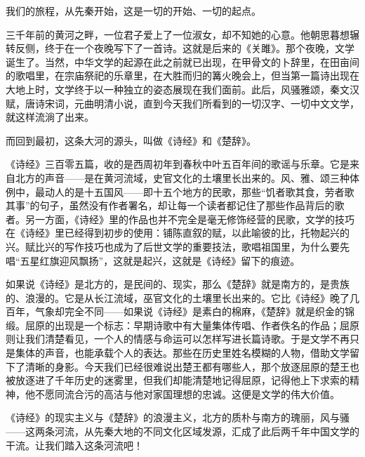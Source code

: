 
\begin{intro}
我们的旅程，从先秦开始，这是一切的开始、一切的起点。

三千年前的黄河之畔，一位君子爱上了一位淑女，却不知她的心意。他朝思暮想辗转反侧，终于在一个夜晚写下了一首诗。这就是后来的《关雎》。那个夜晚，文学诞生了。当然，中华文学的起源在此之前就已出现，在甲骨文的卜辞里，在田亩间的歌唱里，在宗庙祭祀的乐章里，在大胜而归的篝火晚会上，但当第一篇诗出现在大地上时，文学终于以一种独立的姿态展现在我们面前。此后，风骚雅颂，秦文汉赋，唐诗宋词，元曲明清小说，直到今天我们所看到的一切汉字、一切中文文学，就这样流淌了出来。

而回到最初，这条大河的源头，叫做《诗经》和《楚辞》。

《诗经》三百零五篇，收的是西周初年到春秋中叶五百年间的歌谣与乐章。它是来自北方的声音——是在黄河流域，史官文化的土壤里长出来的。风、雅、颂三种体例中，最动人的是十五国风——即十五个地方的民歌，那些“饥者歌其食，劳者歌其事”的句子，虽然没有作者署名，却让每一个读者都记住了那些作品背后的歌者。另一方面，《诗经》里的作品也并不完全是毫无修饰经营的民歌，文学的技巧在《诗经》里已经得到初步的使用：铺陈直叙的赋，以此喻彼的比，托物起兴的兴。赋比兴的写作技巧也成为了后世文学的重要技法，歌唱祖国里，为什么要先唱“五星红旗迎风飘扬”，这就是起兴，这就是《诗经》留下的痕迹。

如果说《诗经》是北方的，是民间的、现实，那么《楚辞》就是南方的，是贵族的、浪漫的。它是从长江流域，巫官文化的土壤里长出来的。它比《诗经》晚了几百年，气象却完全不同——如果说《诗经》是素白的棉麻，《楚辞》就是织金的锦缎。屈原的出现是一个标志：早期诗歌中有大量集体传唱、作者佚名的作品；屈原则让我们清楚看见，一个人的情感与命运可以怎样写进长篇诗歌。于是文学不再只是集体的声音，也能承载个人的表达。那些在历史里姓名模糊的人物，借助文学留下了清晰的身影。今天我们已经很难说出楚王都有哪些人，那个放逐屈原的楚王也被放逐进了千年历史的迷雾里，但我们却能清楚地记得屈原，记得他上下求索的精神，他不愿同流合污的高洁与他对家国理想的忠诚。这便是文学的伟大价值。

《诗经》的现实主义与《楚辞》的浪漫主义，北方的质朴与南方的瑰丽，风与骚——这两条河流，从先秦大地的不同文化区域发源，汇成了此后两千年中国文学的干流。让我们踏入这条河流吧！
\end{intro}
